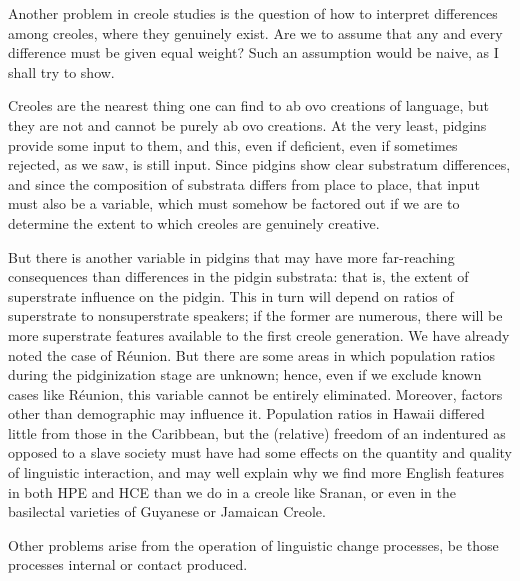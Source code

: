 Another problem in creole studies is the question of how to interpret differences among creoles, where they genuinely exist. Are we to assume that any and every difference must be given equal weight? Such an assumption would be naive, as I shall try to show.

Creoles are the nearest thing one can find to ab ovo creations of language, but they are not and cannot be purely ab ovo creations. At the very least, pidgins provide some input to them, and this, even if deficient, even if sometimes rejected, as we saw, is still input. Since pidgins show clear substratum differences, and since the composition of substrata differs from place to place, that input must also be a variable, which must somehow be factored out if we are to determine the extent to which creoles are genuinely creative.


But there is another variable in pidgins that may have more far-reaching consequences than differences in the pidgin substrata: that is, the extent of superstrate influence on the pidgin. This in turn will depend on ratios of superstrate to nonsuperstrate speakers; if the former are numerous, there will be more superstrate features avail\-able to the first creole generation. We have already noted the case of Réunion. But there are some areas in which population ratios during the pidginization stage are unknown; hence, even if we exclude known cases like Réunion, this variable cannot be entirely eliminated. More\-over, factors other than demographic may influence it. Population ratios in Hawaii differed little from those in the Caribbean, but the (relative) freedom of an indentured as opposed to a slave society must have had some effects on the quantity and quality of linguistic inter\-action, and may well explain why we find more English features in both HPE and HCE than we do in a creole like Sranan, or even in the basilectal varieties of Guyanese or Jamaican Creole.

Other problems arise from the operation of linguistic change processes, be those processes internal or contact produced.

